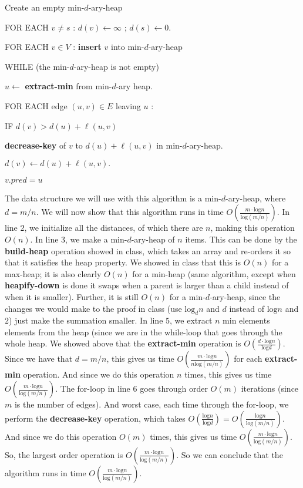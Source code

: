 \documentclass{article}
\begin{document}
\begin{enumerate}
    \item Create an empty min-$d$-ary-heap
    \item FOR EACH $v \neq s$ : $d(v) \leftarrow \infty$ ; $d(s) \leftarrow 0$.
    \item FOR EACH $v \in V$ : \textbf{insert} $v$ into min-$d$-ary-heap
    \item WHILE (the min-$d$-ary-heap is not empty)
    {\setlength\itemindent{25pt} \item $u \leftarrow$ \textbf{extract-min} from
        min-$d$-ary heap.}
    {\setlength\itemindent{25pt} \item FOR EACH edge $(u,v) \in E$ leaving $u$ :}
    {\setlength\itemindent{50pt} \item IF $d(v) > d(u) + \ell(u,v)$}
    {\setlength\itemindent{75pt} \item \textbf{decrease-key} of $v$ to $d(u) + \ell(u,v)$ in
    min-$d$-ary-heap.}
    {\setlength\itemindent{75pt} \item $d(v) \leftarrow d(u) + \ell(u,v).$}
    {\setlength\itemindent{75pt} \item $v.pred = u$}
\end{enumerate}

The data structure we will use with this algorithm is a min-$d$-ary-heap, where
$d = m/n$. We will now show that this algorithm runs in time $O(\frac{m \cdot
\text{log}n}{\text{log}(m/n)})$. In line $2$, we initialize all the distances, of which there
are $n$, making this operation $O(n)$.
In line $3$, we make a min-$d$-ary-heap
of $n$ items. This can be done by the \textbf{build-heap} operation showed in
class, which takes an array and re-orders it so that it satisfies the heap
property. We showed in class that this is $O(n)$ for a max-heap; it is also
clearly $O(n)$ for a min-heap (same algorithm, except when \textbf{heapify-down}
is done it swaps when a parent is larger than a child instead of when it is
smaller). Further, it is still $O(n)$ for a min-$d$-ary-heap, since the changes
we would make to the proof in class (use $\text{log}_dn$ and $d$ instead of
$\text{log}n$ and $2$) just make the summation smaller.
In line $5$, we extract $n$ min elements
elements from the heap (since we are in the while-loop that goes through the
whole heap. We showed above that the \textbf{extract-min} operation is $O(\frac{d \cdot
\text{log}n}{\text{log}d})$. Since we have that $d = m/n$, this gives us time $O(\frac{m \cdot
\text{log}n}{n\text{log}(m/n)})$ for each \textbf{extract-min} operation. And since we do this
operation $n$ times, this gives us time $O(\frac{m \cdot \text{log}n}{\text{log}(m/n)})$.
The for-loop in line $6$ goes through order $O(m)$ iterations (since $m$ is the
number of edges). And worst case, each time through the for-loop, we perform the
\textbf{decrease-key} operation, which takes $O(\frac{\text{log}n}{\text{log}d}) =
O(\frac{\text{log}n}{\text{log}(m/n)})$. And since we do this operation $O(m)$ times, this gives
us time $O(\frac{m \cdot \text{log}n}{\text{log}(m/n)})$. So, the largest order operation is
$O(\frac{m \cdot \text{log}n}{\text{log}(m/n)})$. So we can conclude that the algorithm runs
in time $O(\frac{m \cdot \text{log}n}{\text{log}(m/n)})$.
\end{document}
